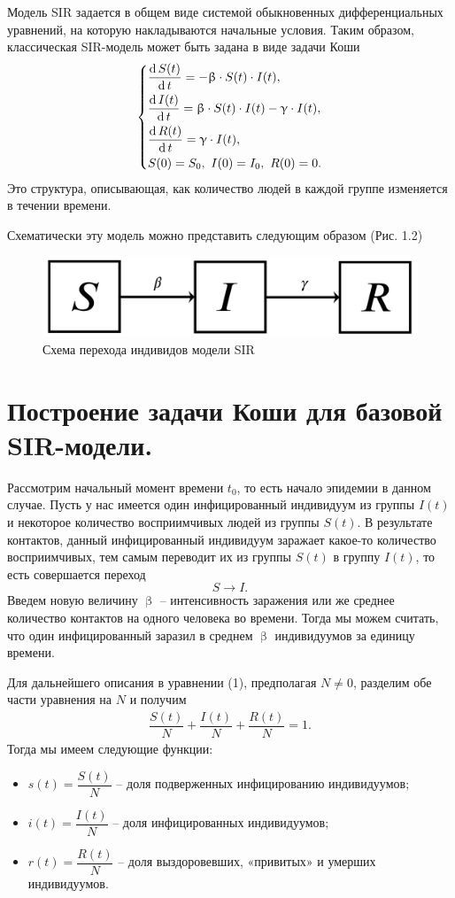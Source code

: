\documentclass[a4paper, 14pt]{extreport}
\renewcommand{\beta}{\upbeta}
\renewcommand{\gamma}{\upgamma}
\renewcommand{\d}{\operatorname{d}}
\begin{document}
	Модель SIR задается в общем виде системой обыкновенных дифференциальных уравнений, на которую накладываются начальные условия. Таким образом, классическая SIR-модель может быть задана в виде задачи Коши
	\begin{equation}
		\begin{dcases}
			\dfrac {\d S(t)}{\d t} = -\beta \cdot S(t) \cdot I(t),\\
			\dfrac{\d I(t)}{\d t} = \beta \cdot S(t)\cdot I(t) - \gamma\cdot I(t),\\
			\dfrac{\d R(t)}{\d t} = \gamma\cdot I(t), \\
			S(0) = S_0,\ I(0) = I_0,\ R(0) = 0.
		\end{dcases}
	\end{equation}
	Это структура, описывающая, как количество людей в каждой группе изменяется в течении времени. 
	
	Схематически эту модель можно представить следующим образом (Рис. 1.2)
	\begin{figure}[h]
		\centering
		\includegraphics[scale=0.25]{images/img06}
		\caption{Схема перехода индивидов модели SIR}
		\label{fig:img06}
	\end{figure}
	
	\section{Построение задачи Коши для базовой SIR-модели.}
	Рассмотрим начальный момент времени $t_0$, то есть начало эпидемии в данном случае. Пусть у нас имеется один инфицированный индивидуум из группы $I(t)$ и некоторое количество восприимчивых людей из группы $S(t)$. В результате контактов, данный инфицированный индивидуум заражает какое-то количество восприимчивых, тем самым переводит их из группы $S(t)$ в группу $I(t)$, то есть совершается переход $$S \to I.$$
	Введем новую величину $\beta$ -- интенсивность заражения или же  среднее количество контактов на одного человека во времени. Тогда мы можем считать, что один инфицированный заразил в среднем $\beta$ индивидуумов за единицу времени.
	
	Для дальнейшего описания в уравнении (1), предполагая $N\ne 0$, разделим обе части уравнения на $N$ и получим 
	\begin{eqnarray}
		\label{const-eq}
		\dfrac{S(t)}{N} + \dfrac{I(t)}{N} + \dfrac{R(t)}N = 1.
	\end{eqnarray}
	Тогда мы имеем следующие функции:
	\begin{itemize}
		\item $s(t) = \dfrac {S(t)} N$ -- доля подверженных инфицированию индивидуумов;
		\item $i(t) = \dfrac{I(t)} N$ -- доля инфицированных индивидуумов;
		\item $r(t) = \dfrac{R(t)} N$ -- доля выздоровевших, «привитых» и умерших индивидуумов.
	\end{itemize}
	
\end{document}

